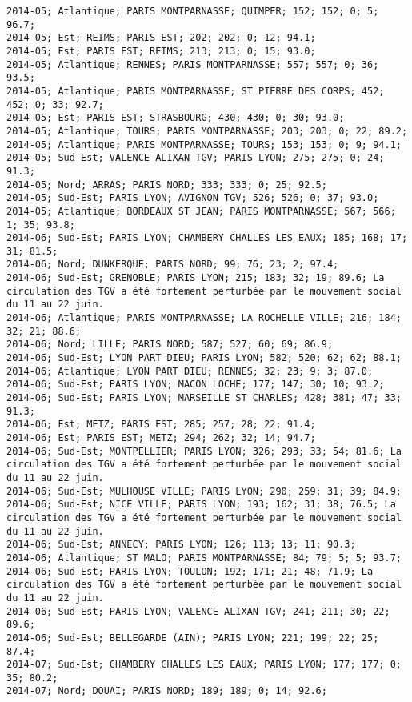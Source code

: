 \documentclass{article}
\begin{document}
\begin{Verbatim}[commandchars=\\\{\}]
2014-05; Atlantique; PARIS MONTPARNASSE; QUIMPER; 152; 152; 0; 5; 96.7; 
2014-05; Est; REIMS; PARIS EST; 202; 202; 0; 12; 94.1; 
2014-05; Est; PARIS EST; REIMS; 213; 213; 0; 15; 93.0; 
2014-05; Atlantique; RENNES; PARIS MONTPARNASSE; 557; 557; 0; 36; 93.5; 
2014-05; Atlantique; PARIS MONTPARNASSE; ST PIERRE DES CORPS; 452; 452; 0; 33; 92.7; 
2014-05; Est; PARIS EST; STRASBOURG; 430; 430; 0; 30; 93.0; 
2014-05; Atlantique; TOURS; PARIS MONTPARNASSE; 203; 203; 0; 22; 89.2; 
2014-05; Atlantique; PARIS MONTPARNASSE; TOURS; 153; 153; 0; 9; 94.1; 
2014-05; Sud-Est; VALENCE ALIXAN TGV; PARIS LYON; 275; 275; 0; 24; 91.3; 
2014-05; Nord; ARRAS; PARIS NORD; 333; 333; 0; 25; 92.5; 
2014-05; Sud-Est; PARIS LYON; AVIGNON TGV; 526; 526; 0; 37; 93.0; 
2014-05; Atlantique; BORDEAUX ST JEAN; PARIS MONTPARNASSE; 567; 566; 1; 35; 93.8; 
2014-06; Sud-Est; PARIS LYON; CHAMBERY CHALLES LES EAUX; 185; 168; 17; 31; 81.5; 
2014-06; Nord; DUNKERQUE; PARIS NORD; 99; 76; 23; 2; 97.4; 
2014-06; Sud-Est; GRENOBLE; PARIS LYON; 215; 183; 32; 19; 89.6; La circulation des TGV a été fortement perturbée par le mouvement social du 11 au 22 juin.
2014-06; Atlantique; PARIS MONTPARNASSE; LA ROCHELLE VILLE; 216; 184; 32; 21; 88.6; 
2014-06; Nord; LILLE; PARIS NORD; 587; 527; 60; 69; 86.9; 
2014-06; Sud-Est; LYON PART DIEU; PARIS LYON; 582; 520; 62; 62; 88.1; 
2014-06; Atlantique; LYON PART DIEU; RENNES; 32; 23; 9; 3; 87.0; 
2014-06; Sud-Est; PARIS LYON; MACON LOCHE; 177; 147; 30; 10; 93.2; 
2014-06; Sud-Est; PARIS LYON; MARSEILLE ST CHARLES; 428; 381; 47; 33; 91.3; 
2014-06; Est; METZ; PARIS EST; 285; 257; 28; 22; 91.4; 
2014-06; Est; PARIS EST; METZ; 294; 262; 32; 14; 94.7; 
2014-06; Sud-Est; MONTPELLIER; PARIS LYON; 326; 293; 33; 54; 81.6; La circulation des TGV a été fortement perturbée par le mouvement social du 11 au 22 juin.
2014-06; Sud-Est; MULHOUSE VILLE; PARIS LYON; 290; 259; 31; 39; 84.9; 
2014-06; Sud-Est; NICE VILLE; PARIS LYON; 193; 162; 31; 38; 76.5; La circulation des TGV a été fortement perturbée par le mouvement social du 11 au 22 juin.
2014-06; Sud-Est; ANNECY; PARIS LYON; 126; 113; 13; 11; 90.3; 
2014-06; Atlantique; ST MALO; PARIS MONTPARNASSE; 84; 79; 5; 5; 93.7; 
2014-06; Sud-Est; PARIS LYON; TOULON; 192; 171; 21; 48; 71.9; La circulation des TGV a été fortement perturbée par le mouvement social du 11 au 22 juin.
2014-06; Sud-Est; PARIS LYON; VALENCE ALIXAN TGV; 241; 211; 30; 22; 89.6; 
2014-06; Sud-Est; BELLEGARDE (AIN); PARIS LYON; 221; 199; 22; 25; 87.4; 
2014-07; Sud-Est; CHAMBERY CHALLES LES EAUX; PARIS LYON; 177; 177; 0; 35; 80.2; 
2014-07; Nord; DOUAI; PARIS NORD; 189; 189; 0; 14; 92.6; 

\end{Verbatim}
\end{document}
